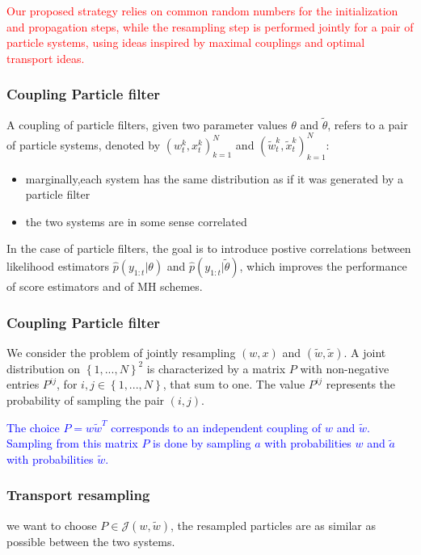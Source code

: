 \documentclass[table]{beamer}
\begin{document}
\begin{CJK}{UTF8}{gbsn}
\begin{frame}
\textcolor{red}{ Our proposed strategy relies on common random numbers for the initialization and propagation steps,
while the resampling step is performed jointly for a pair of particle systems, using ideas inspired
by maximal couplings and optimal transport ideas.}
\end{frame}
\begin{frame}
\frametitle{Coupling Particle filter}
 A coupling of particle filters, given two parameter values $\theta$ and $\tilde{\theta}$, refers to a pair of particle systems, denoted by $(w_t^k,x_t^k)_{k=1}^N$ and $(\tilde{w}_t^k,\tilde{x}_t^k)_{k=1}^N$:
\begin{itemize}
\item marginally,each system has the same distribution as if it was generated by a particle filter
\item the two systems are in some sense correlated
\end{itemize}
In the case of particle filters, the goal is to introduce postive correlations between likelihood estimators $\hat{p}(y_{1:t}|\theta)$ and $\hat{p}(y_{1:t}|\tilde{\theta})$, which improves the performance of score estimators and of MH schemes.
\end{frame}
\begin{frame}
\frametitle{Coupling Particle filter}
We consider the problem of jointly resampling $(w,x)$ and $(\tilde{w},\tilde{x})$. A joint distribution on $\left\{1,...,N \right\}^2$ is characterized by a matrix $P$ with non-negative entries $P^{ij}$, for $i,j \in \left\{1,...,N \right\}$, that sum to one. The value $P^{ij}$ represents the probability of sampling the pair $(i,j)$.\\

\hfill
\vspace{6pt}


\textcolor{blue}{The choice $P = w \tilde{w}^T$ corresponds to an independent coupling of $w$ and $\tilde{w}$. Sampling from this matrix $P$ is done by sampling $a$ with probabilities $w$ and $\tilde{a}$ with probabilities $\tilde{w}$.}

\end{frame}

\begin{frame}
\frametitle{Transport resampling}
we want to choose  $P \in \mathcal{J}(w,\tilde{w})$, the resampled particles are as similar as possible between the two systems.

\hfill
\vspace{6pt}



\end{frame}
\end{CJK}
\end{document}
